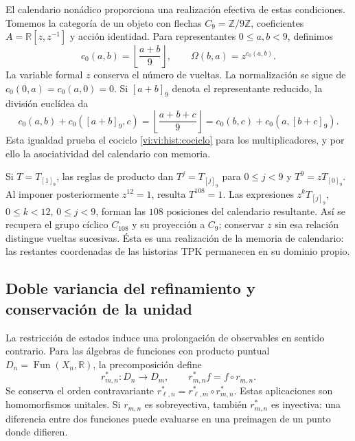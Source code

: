 El calendario nonádico proporciona una realización efectiva de estas
condiciones. Tomemos la categoría de un objeto con flechas
\(C_9=\mathbb Z/9\mathbb Z\), coeficientes
\(A=\mathbb R[z,z^{-1}]\) y acción identidad. Para representantes
\(0\le a,b<9\), definimos
\begin{equation}
 c_0(a,b)=\left\lfloor\frac{a+b}{9}\right\rfloor,
 \qquad\Omega(b,a)=z^{c_0(a,b)}.
 \label{vi:vi:hist:carry-calendario}
\end{equation}
La variable formal \(z\) conserva el número de vueltas. La normalización
se sigue de \(c_0(0,a)=c_0(a,0)=0\). Si \([a+b]_9\) denota el
representante reducido, la división euclídea da
\[
 c_0(a,b)+c_0([a+b]_9,c)
 =\left\lfloor\frac{a+b+c}{9}\right\rfloor
 =c_0(b,c)+c_0(a,[b+c]_9).
\]
Esta igualdad prueba el cociclo \eqref{vi:vi:hist:cociclo} para los
multiplicadores, y por ello la asociatividad del calendario con memoria.

Si \(T=T_{[1]_9}\), las reglas de producto dan
\(T^j=T_{[j]_9}\) para \(0\le j<9\) y \(T^9=zT_{[0]_9}\).
Al imponer posteriormente \(z^{12}=1\), resulta \(T^{108}=1\).
Las expresiones \(z^kT_{[j]_9}\), \(0\le k<12\), \(0\le j<9\),
forman las \(108\) posiciones del calendario resultante. Así se recupera
el grupo cíclico \(C_{108}\) y su proyección a \(C_9\); conservar
\(z\) sin esa relación distingue vueltas sucesivas. Ésta es una
realización de la memoria de calendario: las restantes coordenadas de
las historias TPK permanecen en su dominio propio.

\subsection{Doble variancia del refinamiento y conservación de la unidad}
\label{vi:hist:doble-varianza}

La restricción de estados induce una prolongación de observables en sentido
contrario. Para las álgebras de funciones con producto puntual
\(D_n=\operatorname{Fun}(X_n,\mathbb R)\), la precomposición define
\begin{equation}
 r_{m,n}^*:D_n\longrightarrow D_m,
 \qquad r_{m,n}^*f=f\circ r_{m,n}.
 \label{vi:vi:hist:precomposicion}
\end{equation}
Se conserva el orden contravariante
\(r_{\ell,n}^*=r_{\ell,m}^*\circ r_{m,n}^*\). Estas aplicaciones
son homomorfismos unitales. Si \(r_{m,n}\) es sobreyectiva, también
\(r_{m,n}^*\) es inyectiva: una diferencia entre dos funciones puede
evaluarse en una preimagen de un punto donde difieren.

